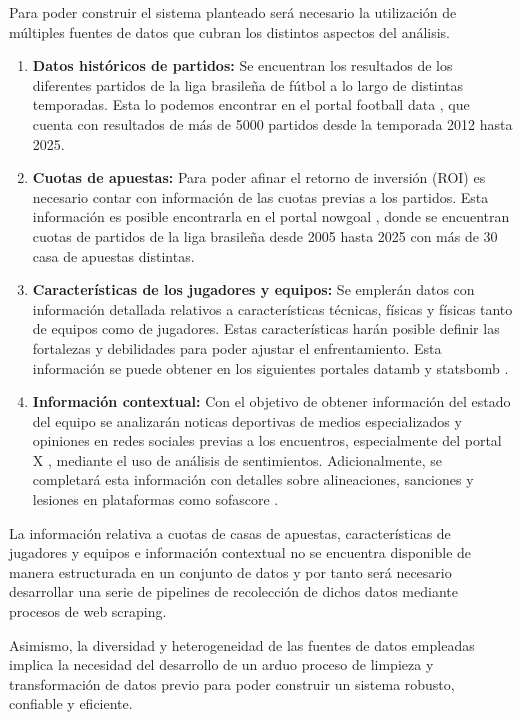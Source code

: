Para poder construir el sistema planteado será necesario la utilización de múltiples fuentes de datos que cubran los distintos aspectos del análisis.

\begin{enumerate}
    \item \textbf{Datos históricos de partidos:} Se encuentran los resultados de los diferentes partidos de la liga brasileña de fútbol a lo largo de distintas temporadas. Esta lo podemos encontrar en el portal football data \cite{footballData}, que cuenta con resultados de más de 5000 partidos desde la temporada 2012 hasta 2025.

    \item \textbf{Cuotas de apuestas:} Para poder afinar el retorno de inversión (ROI) es necesario contar con información de las cuotas previas a los partidos. Esta información es posible encontrarla en el portal nowgoal \cite{nowgoalOdds}, donde se encuentran cuotas de partidos de la liga brasileña desde 2005 hasta 2025 con más de 30 casa de apuestas distintas.
    
    \item \textbf{Características de los jugadores y equipos:} Se emplerán datos con información detallada relativos a características técnicas, físicas y físicas tanto de equipos como de jugadores. Estas características harán posible definir las fortalezas y debilidades para poder ajustar el enfrentamiento. Esta información se puede obtener en los siguientes portales datamb \cite{datamb} y statsbomb \cite{statsbomb}.
    \item \textbf{Información contextual:} Con el objetivo de obtener información del estado del equipo se analizarán noticas deportivas de medios especializados y opiniones en redes sociales previas a los encuentros, especialmente del portal X \cite{twitter}, mediante el uso de análisis de sentimientos. Adicionalmente, se completará esta información con detalles sobre alineaciones, sanciones y lesiones en plataformas como sofascore \cite{sofascore}.
\end{enumerate}


La información relativa a cuotas de casas de apuestas, características de jugadores y equipos e información contextual no se encuentra disponible de manera estructurada en un conjunto de datos y por tanto será necesario desarrollar una serie de pipelines de recolección de dichos datos mediante procesos de web scraping. 

Asimismo, la diversidad y heterogeneidad de las fuentes de datos empleadas implica la necesidad del desarrollo de un arduo proceso de limpieza y transformación de datos previo para poder construir un sistema robusto, confiable y eficiente. 


